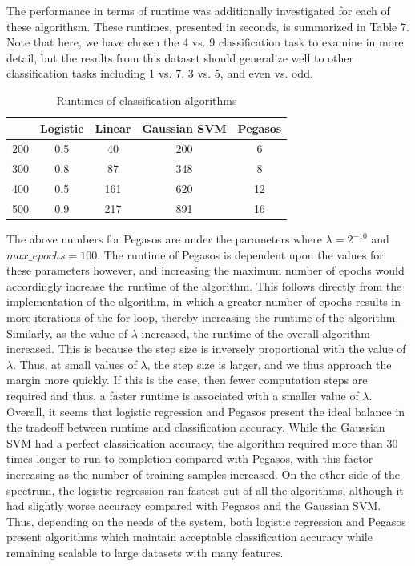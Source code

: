\documentclass{article}
\begin{document}
The performance in terms of runtime was additionally investigated for each of these algorithsm. These runtimes, presented in seconds, is summarized in Table 7. Note that here, we have chosen the 4 vs. 9 classification task to examine in more detail, but the results from this dataset should generalize well to other classification tasks including 1 vs. 7, 3 vs. 5, and even vs. odd. \\

\begin{table}
  \begin{center}
    \begin{tabular}{ | c | c | c | c | c | }
      \hline
             & Logistic     & Linear   & Gaussian SVM & Pegasos    \\ \hline
      200    & 0.5          & 40           & 200           & 6          \\ \hline
      300    & 0.8          & 87           & 348           & 8          \\ \hline
      400    & 0.5          & 161          & 620           & 12         \\ \hline
      500    & 0.9          & 217          & 891           & 16         \\ \hline
    \end{tabular}
  \end{center}
  \caption{Runtimes of classification algorithms}
\end{table}

The above numbers for Pegasos are under the parameters where $\lambda = 2^{-10}$ and $max\_epochs = 100$. The runtime of Pegasos is dependent upon the values for these parameters however, and increasing the maximum number of epochs would accordingly increase the runtime of the algorithm. This follows directly from the implementation of the algorithm, in which a greater number of epochs results in more iterations of the for loop, thereby increasing the runtime of the algorithm. Similarly, as the value of $\lambda$ increased, the runtime of the overall algorithm increased. This is because the step size is inversely proportional with the value of $\lambda$. Thus, at small values of $\lambda$, the step size is larger, and we thus approach the margin more quickly. If this is the case, then fewer computation steps are required and thus, a faster runtime is associated with a smaller value of $\lambda$. \\

Overall, it seems that logistic regression and Pegasos present the ideal balance in the tradeoff between runtime and classification accuracy. While the Gaussian SVM had a perfect classification accuracy, the algorithm required more than 30 times longer to run to completion compared with Pegasos, with this factor increasing as the number of training samples increased. On the other side of the spectrum, the logistic regression ran fastest out of all the algorithms, although it had slightly worse accuracy compared with Pegasos and the Gaussian SVM. Thus, depending on the needs of the system, both logistic regression and Pegasos present algorithms which maintain acceptable classification accuracy while remaining scalable to large datasets with many features.
\end{document}
